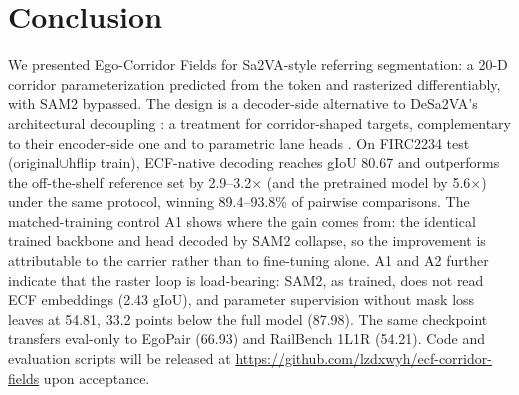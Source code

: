 \section{Conclusion}
\label{sec:conclusion}

We presented Ego-Corridor Fields for Sa2VA-style referring segmentation: a 20-D corridor parameterization predicted from the \Seg{} token and rasterized differentiably, with SAM2 bypassed.
The design is a decoder-side alternative to DeSa2VA's architectural decoupling \citep{dang2025desa2va}: a treatment for corridor-shaped targets, complementary to their encoder-side one and to parametric lane heads \citep{tabelini2021polylanenet,feng2022bezierlanenet}.
On FIRC2234 test (original$\cup$hflip train), ECF-native decoding reaches gIoU 80.67 and outperforms the off-the-shelf reference set by 2.9--3.2$\times$ (and the pretrained model by 5.6$\times$) under the same protocol, winning 89.4--93.8\% of pairwise comparisons.
The matched-training control A1 shows where the gain comes from: the identical trained backbone and head decoded by SAM2 collapse, so the improvement is attributable to the carrier rather than to fine-tuning alone.
A1 and A2 further indicate that the raster loop is load-bearing: SAM2, as trained, does not read ECF embeddings (2.43 gIoU), and parameter supervision without mask loss leaves  at 54.81, 33.2 points below the full model (87.98).
The same checkpoint transfers eval-only to EgoPair (66.93) and RailBench 1L1R (54.21).
Code and evaluation scripts will be released at \url{https://github.com/lzdxwyh/ecf-corridor-fields} upon acceptance.
